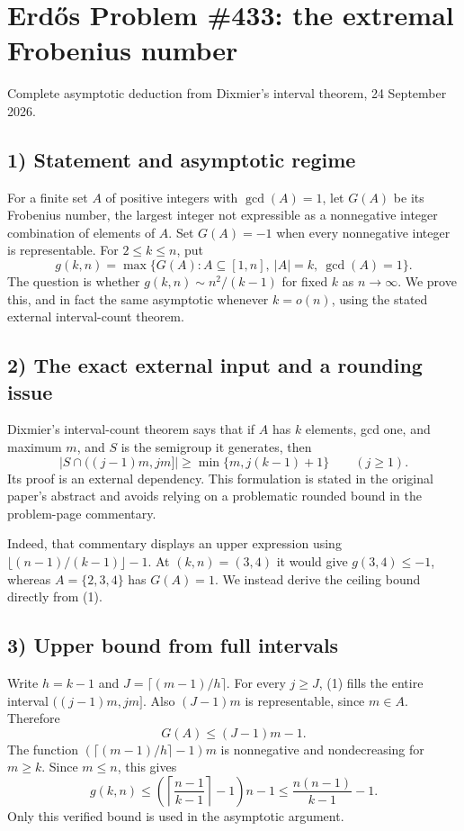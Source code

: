 \section{Erd\H{o}s Problem \#433: the extremal Frobenius number}
\noindent Complete asymptotic deduction from Dixmier's interval theorem, 24 September 2026.

\subsection*{1) Statement and asymptotic regime}
For a finite set $A$ of positive integers with $\gcd(A)=1$, let $G(A)$ be its Frobenius number, the largest integer not expressible as a nonnegative integer combination of elements of $A$. Set $G(A)=-1$ when every nonnegative integer is representable. For $2\le k\le n$, put
\[g(k,n)=\max\{G(A):A\subseteq[1,n],\ |A|=k,\ \gcd(A)=1\}.
\]
The question is whether $g(k,n)\sim n^2/(k-1)$ for fixed $k$ as $n\to\infty$. We prove this, and in fact the same asymptotic whenever $k=o(n)$, using the stated external interval-count theorem.

\subsection*{2) The exact external input and a rounding issue}
Dixmier's interval-count theorem says that if $A$ has $k$ elements, gcd one, and maximum $m$, and $S$ is the semigroup it generates, then
\[|S\cap((j-1)m,jm]|\ge\min\{m,j(k-1)+1\}\qquad(j\ge1).\tag{1}\]
Its proof is an external dependency. This formulation is stated in the original paper's abstract and avoids relying on a problematic rounded bound in the problem-page commentary.

Indeed, that commentary displays an upper expression using $\lfloor(n-1)/(k-1)\rfloor-1$. At $(k,n)=(3,4)$ it would give $g(3,4)\le-1$, whereas $A=\{2,3,4\}$ has $G(A)=1$. We instead derive the ceiling bound directly from (1).

\subsection*{3) Upper bound from full intervals}
Write $h=k-1$ and $J=\lceil(m-1)/h\rceil$. For every $j\ge J$, (1) fills the entire interval $((j-1)m,jm]$. Also $(J-1)m$ is representable, since $m\in A$. Therefore
\[G(A)\le(J-1)m-1.
\]
The function $(\lceil(m-1)/h\rceil-1)m$ is nonnegative and nondecreasing for $m\ge k$. Since $m\le n$, this gives
\[g(k,n)\le\left(\left\lceil\frac{n-1}{k-1}\right\rceil-1\right)n-1
\le\frac{n(n-1)}{k-1}-1.\tag{2}\]
Only this verified bound is used in the asymptotic argument.

